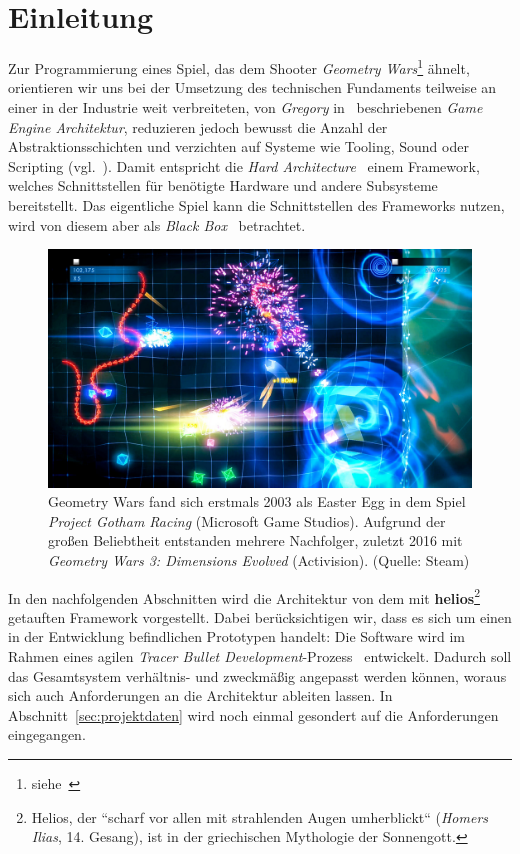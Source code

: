 \section{Einleitung}

Zur Programmierung eines Spiel, das dem Shooter \textit{Geometry Wars}\footnote{siehe~\cite[]{WikipediaGeometryWars}} ähnelt, orientieren wir uns bei der Umsetzung des technischen Fundaments teilweise an einer in der Industrie weit verbreiteten, von \textit{Gregory} in~\cite[]{Gre19} beschriebenen \textit{Game Engine Architektur}, reduzieren jedoch bewusst die Anzahl der Abstraktionsschichten und verzichten auf Systeme wie Tooling, Sound oder Scripting (vgl.~\cite[\textbf{Figure 1.16}, 39]{Gre19}).
Damit entspricht die \textit{Hard Architecture}~\cite[]{RM04} einem Framework, welches Schnittstellen für benötigte Hardware und andere Subsysteme bereitstellt.
Das eigentliche Spiel kann die Schnittstellen des Frameworks nutzen, wird von diesem aber als \textit{Black Box}~\cite[]{RB88} betrachtet.\\

\begin{figure}[!h]
    \centering
    \includegraphics[width=1\columnwidth]{img/geometry_wars}
    \caption{Geometry Wars fand sich erstmals 2003 als Easter Egg in dem Spiel \textit{Project Gotham Racing} (Microsoft Game Studios). Aufgrund der großen Beliebtheit entstanden mehrere Nachfolger, zuletzt 2016 mit \textit{Geometry Wars 3: Dimensions Evolved} (Activision). (Quelle: Steam)}
    \label{fig:geometry_wars}
\end{figure}

In den nachfolgenden Abschnitten wird die Architektur von dem mit \textbf{helios}\footnote{
    Helios, der ``scharf vor allen mit strahlenden Augen umherblickt`` (\textit{Homers Ilias}, 14. Gesang), ist in der griechischen Mythologie der Sonnengott.
} getauften Framework vorgestellt.
Dabei berücksichtigen wir, dass es sich um einen in der Entwicklung befindlichen Prototypen handelt:
Die Software wird im Rahmen eines agilen \textit{Tracer Bullet Development}-Prozess~\cite[50 f.]{TH20} entwickelt.
Dadurch soll das Gesamtsystem verhältnis- und zweckmäßig angepasst werden können, woraus sich auch Anforderungen an die Architektur ableiten lassen.
In Abschnitt~\ref{sec:projektdaten} wird noch einmal gesondert auf die Anforderungen eingegangen. \\

